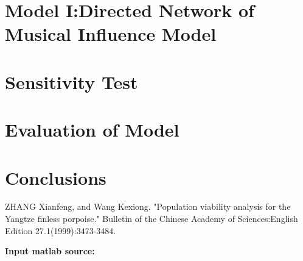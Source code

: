 \documentclass{mcmthesis}
\numberwithin{figure}{section}
\numberwithin{table}{section}
\numberwithin{equation}{section}
\begin{document}
\section{Model I:Directed Network of Musical Influence Model}

\section{Sensitivity Test}

\section{Evaluation of Model}

\section{Conclusions}

\newpage
{}
\memodate{\today}

\begin{memo}[report]
  
\end{memo}




\newpage


\begin{thebibliography}{99}
 ZHANG Xianfeng, and Wang Kexiong. "Population viability analysis for the Yangtze finless porpoise." Bulletin of the Chinese Academy of Sciences:English Edition 27.1(1999):3473-3484.

\end{thebibliography}


\newpage


\lhead{\small\sffamily \team}

\begin{appendices}




\textbf{\textcolor[rgb]{0.98,0.00,0.00}{Input matlab source:}}
% 
% 
% 


\end{appendices}
\end{document}
